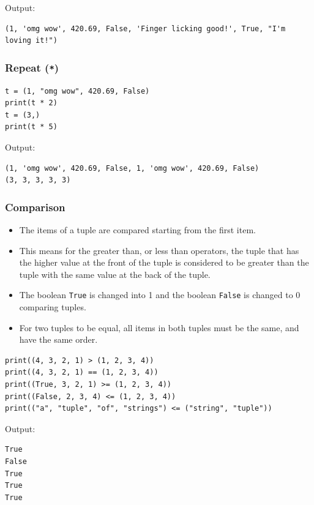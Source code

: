 \documentclass[11pt]{article}
\begin{document}
 \noindent Output:

\begin{verbatim}
(1, 'omg wow', 420.69, False, 'Finger licking good!', True, "I'm loving it!")
\end{verbatim}

\subsubsection{Repeat (\texttt{*})}
\label{sec:orgc995c72}
\begin{verbatim}
t = (1, "omg wow", 420.69, False)
print(t * 2)
t = (3,)
print(t * 5)
\end{verbatim}

 \noindent Output:

\begin{verbatim}
(1, 'omg wow', 420.69, False, 1, 'omg wow', 420.69, False)
(3, 3, 3, 3, 3)
\end{verbatim}

\subsubsection{Comparison}
\label{sec:org75ac563}
\begin{itemize}
\item The items of a tuple are compared starting from the first item.
\item This means for the greater than, or less than operators, the tuple that has the higher value at the front of the tuple is considered to be greater than the tuple with the same value at the back of the tuple.
\item The boolean \texttt{True} is changed into 1 and the boolean \texttt{False} is changed to 0 comparing tuples.
\item For two tuples to be equal, all items in both tuples must be the same, and have the same order.
\end{itemize}
\begin{verbatim}
print((4, 3, 2, 1) > (1, 2, 3, 4))
print((4, 3, 2, 1) == (1, 2, 3, 4))
print((True, 3, 2, 1) >= (1, 2, 3, 4))
print((False, 2, 3, 4) <= (1, 2, 3, 4))
print(("a", "tuple", "of", "strings") <= ("string", "tuple"))
\end{verbatim}

 \noindent Output:

\begin{verbatim}
True
False
True
True
True
\end{verbatim}
\end{document}
